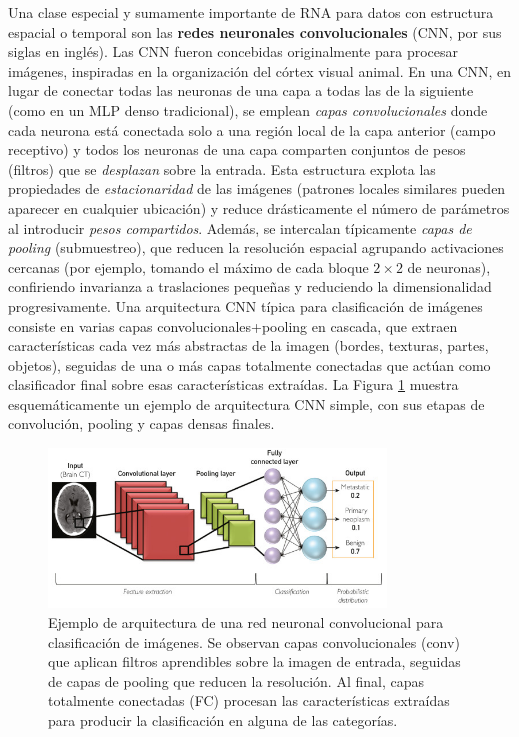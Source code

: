 \documentclass[11pt,spanish,listoffigures,listoftables]{tfgetsinf}
\begin{document}
Una clase especial y sumamente importante de RNA para datos con estructura espacial o temporal son las \textbf{redes neuronales convolucionales} 
(CNN, por sus siglas en inglés). Las CNN fueron concebidas originalmente para procesar imágenes, inspiradas en la organización del córtex visual animal. 
En una CNN, en lugar de conectar todas las neuronas de una capa a todas las de la siguiente (como en un MLP denso tradicional), se emplean \textit{capas convolucionales} 
donde cada neurona está conectada solo a una región local de la capa anterior (campo receptivo) y todos los neuronas de una capa comparten conjuntos de pesos (filtros)
que se \textit{desplazan} sobre la entrada. Esta estructura explota las propiedades de \textit{estacionaridad} de las imágenes (patrones locales similares pueden 
aparecer en cualquier ubicación) y reduce drásticamente el número de parámetros al introducir \textit{pesos compartidos}. Además, se intercalan típicamente 
\textit{capas de pooling} (submuestreo), que reducen la resolución espacial agrupando activaciones cercanas (por ejemplo, tomando el máximo de cada bloque $2\times2$ 
de neuronas), confiriendo invarianza a traslaciones pequeñas y reduciendo la dimensionalidad progresivamente. Una arquitectura CNN típica para clasificación de 
imágenes consiste en varias capas convolucionales+pooling en cascada, que extraen características cada vez más abstractas de la imagen (bordes, texturas, partes, objetos), 
seguidas de una o más capas totalmente conectadas que actúan como clasificador final sobre esas características extraídas. La Figura \ref{fig:cnn_arch} muestra 
esquemáticamente un ejemplo de arquitectura CNN simple, con sus etapas de convolución, pooling y capas densas finales.

\begin{figure}[ht] \centering \includegraphics[width=0.8\textwidth]{cnn.png} 
    \caption{Ejemplo de arquitectura de una red neuronal convolucional para clasificación de imágenes. Se observan capas convolucionales (conv) que aplican 
    filtros aprendibles sobre la imagen de entrada, seguidas de capas de pooling que reducen la resolución. Al final, capas totalmente conectadas (FC) procesan 
    las características extraídas para producir la clasificación en alguna de las categorías.} 
    \label{fig:cnn_arch} 
\end{figure}
\end{document}
